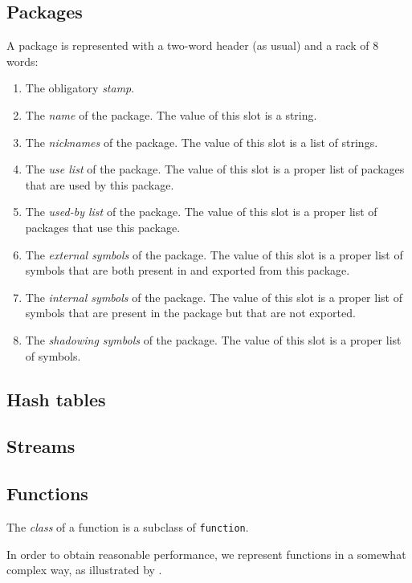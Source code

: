 \subsection{Packages}

A package is represented with a two-word header (as usual) and a
rack of 8 words:

\begin{enumerate}
\item The obligatory \emph{stamp}.
\item The \emph{name} of the package.  The value of this slot is a
  string.
\item The \emph{nicknames} of the package.  The value of this slot is
  a list of strings. 
\item The \emph{use list} of the package.  The value of this slot is a
  proper list of packages that are used by this package. 
\item The \emph{used-by list} of the package.  The value of this slot
is a proper list of packages that use this package. 
\item The \emph{external symbols} of the package.  The value of this
  slot is a proper list of symbols that are both present in and
  exported from this package.
\item The \emph{internal symbols} of the package.  The value of this
  slot is a proper list of symbols that are present in the package but
  that are not exported.
\item The \emph{shadowing symbols} of the package.  The value of this
  slot is a proper list of symbols. 
\end{enumerate}

\subsection{Hash tables}

\subsection{Streams}

\subsection{Functions}
\label{sec-data-representation-functions}

The \emph{class} of a function is a subclass of \texttt{function}.

In order to obtain reasonable performance, we represent functions in a
somewhat complex way, as illustrated by
. 

